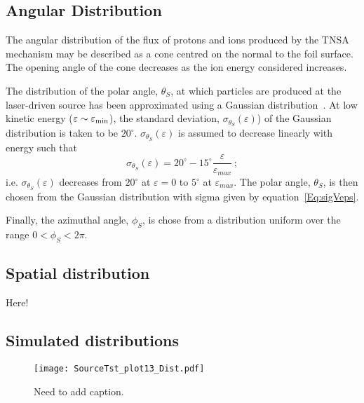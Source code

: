 \subsection{Angular Distribution}

The angular distribution of the flux of protons and ions produced by
the TNSA mechanism may be described as a cone centred on the normal to
the foil surface.
The opening angle of the cone decreases as the ion energy considered
increases.

The distribution of the polar angle, $\theta_S$, at which particles
are produced at the laser-driven source has been approximated using a
Gaussian distribution~\cite{10.1038/s41598-019-41705-0}.  
At low kinetic energy ($\varepsilon \sim \varepsilon_{\rm min}$), the
standard deviation, $\sigma_{\theta_S}(\varepsilon)$) of the Gaussian
distribution is taken to be $20^\circ$.
$\sigma_{\theta_S}(\varepsilon)$ is assumed to decrease linearly with
energy such that
\begin{equation}
  \sigma_{\theta_S}(\varepsilon) =
                20^\circ - 15^\circ \frac{\varepsilon}{\varepsilon_{max}} \, ;
  \label{Eq:sigVeps}
\end{equation}
i.e. $\sigma_{\theta_S}(\varepsilon)$ decreases from $20^\circ$ at
$\varepsilon=0$ to $5^\circ$ at $\varepsilon_{max}$.
The polar angle, $\theta_S$, is then chosen from the Gaussian
distribution with sigma given by equation~\ref{Eq:sigVeps}.

Finally, the azimuthal angle, $\phi_S$, is chose from a distribution
uniform over the range $0 < \phi_S < 2\pi$.

\subsection{Spatial distribution}

Here!

\subsection{Simulated distributions}

\begin{figure}
  \begin{center}
    \texttt{[image: SourceTst\_plot13\_Dist.pdf]}
  \end{center}
  \caption{Need to add caption.}
\end{figure}
